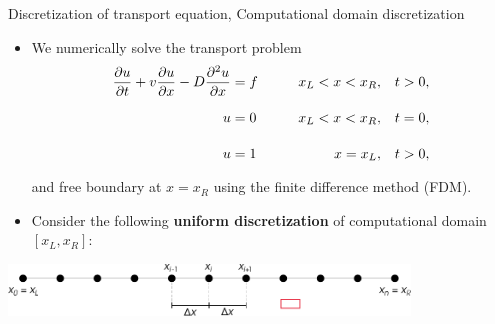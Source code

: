 \begin{frame}{Discretization of transport equation, Computational domain discretization}
\begin{itemize}
\item We \alert{numerically solve} the transport problem
\begin{alignat*}{4}
\frac{\partial u}{\partial t}+v\frac{\partial u}{\partial x}-D\frac{\partial^{2}u}{\partial x} & =f &  x_L <x<x_R, &\quad t>0,\\
u & =0\qquad \vphantom{\frac{\partial^{2}u}{\partial x}} & x_L< x <x_R, & \quad t=0,\\
u & =1 \vphantom{\frac{\partial^{2}u}{\partial x}} & x=x_L,& \quad t>0,
\end{alignat*}
and free boundary at $x=x_R$ using the \alert{finite difference method (FDM)}.\\[5pt]
%
\item Consider the following \textbf{uniform discretization} of computational  domain $[x_L, x_R]$:
\end{itemize}
%
\vskip 20pt
\begin{center}
\includegraphics[width=0.8\textwidth]{figures/reactive-transport/finite-difference-domain-discretization}
\end{center}

\end{frame}
%
%
